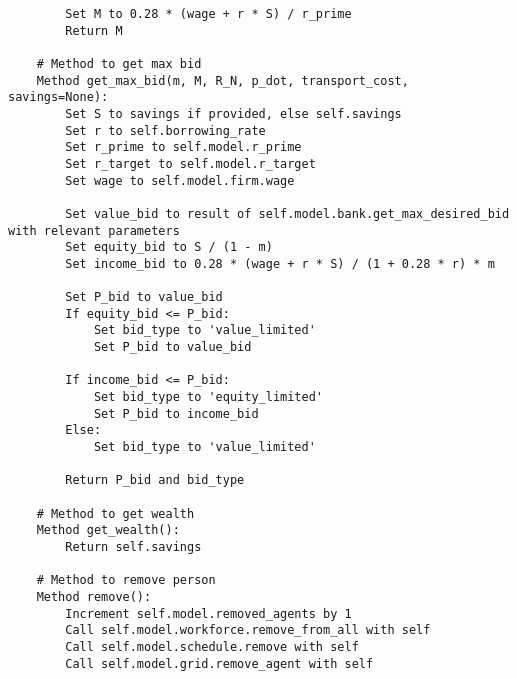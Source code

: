 {\begin{verbatim}
        Set M to 0.28 * (wage + r * S) / r_prime
        Return M

    # Method to get max bid
    Method get_max_bid(m, M, R_N, p_dot, transport_cost, savings=None):
        Set S to savings if provided, else self.savings
        Set r to self.borrowing_rate
        Set r_prime to self.model.r_prime
        Set r_target to self.model.r_target
        Set wage to self.model.firm.wage

        Set value_bid to result of self.model.bank.get_max_desired_bid with relevant parameters
        Set equity_bid to S / (1 - m)
        Set income_bid to 0.28 * (wage + r * S) / (1 + 0.28 * r) * m

        Set P_bid to value_bid
        If equity_bid <= P_bid:
            Set bid_type to 'value_limited'
            Set P_bid to value_bid

        If income_bid <= P_bid:
            Set bid_type to 'equity_limited'
            Set P_bid to income_bid
        Else:
            Set bid_type to 'value_limited'

        Return P_bid and bid_type

    # Method to get wealth
    Method get_wealth():
        Return self.savings

    # Method to remove person
    Method remove():
        Increment self.model.removed_agents by 1
        Call self.model.workforce.remove_from_all with self
        Call self.model.schedule.remove with self
        Call self.model.grid.remove_agent with self


\end{verbatim} }

